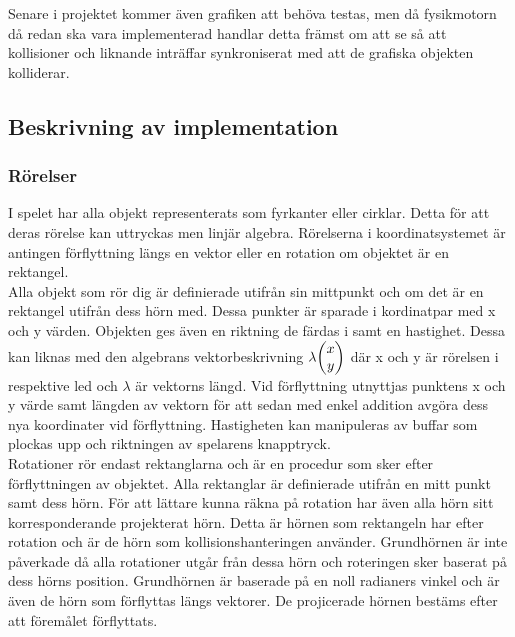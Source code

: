 \documentclass[12pt,a4paper]{article}
\newcounter{subsubsubsection}[subsubsection]
\begin{document}
Senare i projektet kommer även grafiken att behöva testas, men då fysikmotorn då redan ska vara implementerad handlar detta främst om att se så att kollisioner och liknande inträffar synkroniserat med att de grafiska objekten kolliderar. \\

\subsection{Beskrivning av implementation}


\subsubsection{Rörelser}
I spelet har alla objekt representerats som fyrkanter eller cirklar. Detta för att deras rörelse kan uttryckas men linjär algebra. Rörelserna i koordinatsystemet är antingen förflyttning längs en vektor eller en rotation om objektet är en rektangel. \\

Alla objekt som rör dig är definierade utifrån sin mittpunkt och om det är en rektangel utifrån dess hörn med. Dessa punkter är sparade i kordinatpar med x och y värden. Objekten ges även en riktning de färdas i samt en hastighet. Dessa kan liknas med den algebrans vektorbeskrivning
\begin{math}
$$\lambda$$
	\begin{pmatrix}
		x \\
		y
	\end{pmatrix}
\end{math}
där x och y är rörelsen i respektive led och $\lambda$ är vektorns längd. Vid förflyttning utnyttjas punktens x och y värde samt längden av vektorn för att sedan med enkel addition avgöra dess nya koordinater vid förflyttning. Hastigheten kan manipuleras av buffar som plockas upp och riktningen av spelarens knapptryck. \\

Rotationer rör endast rektanglarna och är en procedur som sker efter förflyttningen av objektet. Alla rektanglar är definierade utifrån en mitt punkt samt dess hörn. För att lättare kunna räkna på rotation har även alla hörn sitt korresponderande projekterat hörn. Detta är hörnen som rektangeln har efter rotation och är de hörn som kollisionshanteringen använder. Grundhörnen är inte påverkade då alla rotationer utgår från dessa hörn och roteringen sker baserat på dess hörns position. Grundhörnen är baserade på en noll radianers vinkel och är även de hörn som förflyttas längs vektorer. De projicerade hörnen bestäms efter att föremålet förflyttats. \\
\end{document}
